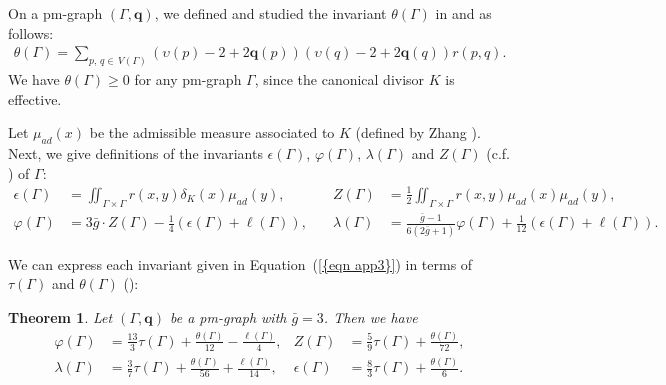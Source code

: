 \documentclass[12pt]{amsart}
\newtheorem{theorem}{Theorem}[section]
\theoremstyle{example}
\theoremstyle{definition}
\theoremstyle{notation}
\begin{document}
On a pm-graph $({\Gamma},{\textbf{q}})$, we defined and studied the invariant ${\theta ({\Gamma})}$ in \cite{C1} and \cite{C5} as follows:
\begin{equation}\label{eqn tcg}
\begin{split}
{\theta ({\Gamma})}=\sum_{p, \, q \in \, {V({\Gamma})}}({\upsilon}(p)-2+2 {\textbf{q}} (p))({\upsilon}(q)-2+2 {\textbf{q}} (q))r(p,q).
\end{split}
\end{equation}
We have ${\theta ({\Gamma})} \geq 0$ for any pm-graph ${\Gamma}$, since the canonical divisor $K$ is effective.

Let ${\mu_{{ad}}}(x)$ be the admissible measure associated to $K$ (defined by Zhang \cite[Lemma 3.7]{Zh1}).
Next, we give definitions of the invariants ${\epsilon({\Gamma})}$, ${\varphi ({\Gamma})}$, ${\lambda ({\Gamma})}$ and $Z({\Gamma})$ (c.f. \cite[Section 4.1]{Zh2}) of ${\Gamma}$:
\begin{equation}\label{eqn app3}
\begin{aligned}
{\epsilon({\Gamma})} &=\iint_{\Gamma \times \Gamma} r(x,y) {\delta_{{K}}}(x)  {\mu_{{ad}}}(y), & \quad Z({\Gamma}) &=\frac{1}{2} \iint_{\Gamma \times \Gamma} r(x,y) {\mu_{{ad}}}(x) {\mu_{{ad}}}(y),
\\
{\varphi ({\Gamma})} &=3 {\bar{g}} \cdot Z({\Gamma}) -\frac{1}{4} ({\epsilon({\Gamma})} +\ell ({\Gamma})), & \quad {\lambda ({\Gamma})} &=\frac{{\bar{g}}-1}{6 (2 {\bar{g}}+1)} {\varphi ({\Gamma})} +\frac{1}{12}({\epsilon({\Gamma})} +{\ell ({\Gamma})}).
\end{aligned}
\end{equation}

We can express each invariant given in {Equation~(\ref{{eqn app3}})} in terms of ${\tau(\Gamma)}$ and ${\theta ({\Gamma})}$ (\cite[Propositions 4.6, 4.7, 4.9 and Theorem 4.8]{C5}):
\begin{theorem}\label{thm pmginv and tau}
Let $({\Gamma},{\textbf{q}})$ be a pm-graph with ${\bar{g}} =3$. Then we have
\begin{align*}\label{eqn pmginv and tau}
{\varphi ({\Gamma})} &= \frac{13}{3}{\tau(\Gamma)} +\frac{\theta ({\Gamma})}{12}-\frac{\ell ({\Gamma})}{4},&  Z({\Gamma}) &= \frac{5}{9} {\tau(\Gamma)}+\frac{{\theta}({\Gamma})}{72},
\\ {\lambda ({\Gamma})} &= \frac{3}{7} {\tau(\Gamma)}+\frac{\theta ({\Gamma})}{56}+\frac{\ell ({\Gamma})}{14},&  {\epsilon({\Gamma})} & = \frac{8}{3} {\tau(\Gamma)} + \frac{\theta ({\Gamma})}{6}.
\end{align*}
\end{theorem}
\end{document}
